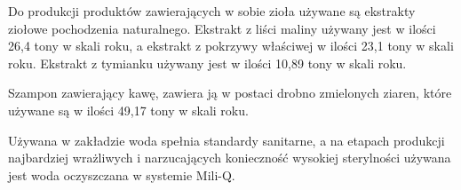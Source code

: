 Do produkcji produktów zawierających w sobie zioła używane są ekstrakty ziołowe pochodzenia naturalnego. Ekstrakt z liści maliny używany jest w ilości 26,4 tony w skali roku, a ekstrakt z pokrzywy właściwej w ilości 23,1 tony w skali roku. Ekstrakt z tymianku używany jest w ilości 10,89 tony w skali roku.

Szampon zawierający kawę, zawiera ją w postaci drobno zmielonych ziaren, które używane są w ilości 49,17 tony w skali roku.\vspace{\baselineskip}

Używana w zakładzie woda spełnia standardy sanitarne, a na etapach produkcji najbardziej wrażliwych i narzucających konieczność wysokiej sterylności używana jest woda oczyszczana w systemie Mili-Q.
